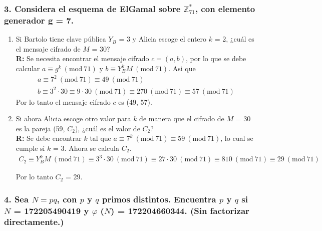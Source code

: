 \documentclass[14pt]{article}
\newcommand{\Mod}[1]{\ (\mathrm{mod}\ #1)}
\begin{document}
\subsubsection*{3. Considera el esquema de ElGamal sobre $\mathbb{Z}^*_{71}$, con elemento generador g = 7.}
\begin{enumerate}[label=\alph*)]
\item Si Bartolo tiene clave pública $Y_B$ = 3 y Alicia escoge el entero $k$ = 2, ¿cuál es el mensaje cifrado de $M$ = 30? \\
  
    \textbf{R:}  Se necesita encontrar el mensaje cifrado $c = (a, b)$, por lo que se debe calcular $a \equiv g^k \Mod{71}$ y $b \equiv Y_B^kM \Mod{71}$. Asi que
  \begin{gather*}
    a \equiv 7^2 \Mod{71} \equiv 49 \Mod{71} \\
    b \equiv 3^2 \cdot 30 \equiv 9 \cdot 30 \Mod{71} \equiv 270 \Mod{71} \equiv 57 \Mod{71}
  \end{gather*}
  Por lo tanto el mensaje cifrado $c$ es (49, 57). \\

  
\item Si ahora Alicia escoge otro valor para $k$ de manera que el cifrado de $M$ = 30 es la pareja (59, $C_2$), ¿cuál es el valor de $C_2$? \\
  
    \textbf{R:}  Se debe encontrar $k$ tal que $a \equiv 7^k \Mod{71} \equiv 59 \Mod{71}$, lo cual se cumple si $k$ = 3. Ahora se calcula $C_2$.
  \begin{gather*}
    C_2 \equiv Y_B^kM \Mod{71} \equiv 3^3 \cdot 30 \Mod{71} \equiv 27 \cdot 30 \Mod{71} \equiv 810 \Mod{71} \equiv 29 \Mod{71}
  \end{gather*}

  Por lo tanto $C_2$ = 29.
  
\end{enumerate}
\subsubsection*{4. Sea $N = pq$, con $p$ y $q$ primos distintos. Encuentra $p$ y $q$ si $N$ = 172205490419 y $\varphi$ ($N$) = 172204660344. (Sin factorizar directamente.)}
\end{document}
